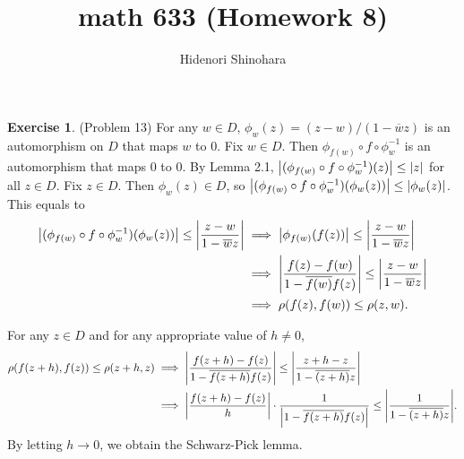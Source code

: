 \documentclass[12pt, psamsfonts]{amsart}
\theoremstyle{definition}
\newtheorem*{exer}{Exercise}
\theoremstyle{remark}
\numberwithin{equation}{section}
\begin{document}
\title{math 633 (Homework 8)}
\author{Hidenori Shinohara}
\maketitle

\begin{exer}{(Problem 13)}
  For any $w \in D$, $\phi_w(z) = (z - w) / (1 - \overline{w}z)$ is an automorphism on $D$ that maps $w$ to $0$.
  Fix $w \in D$.
  Then $\phi_{f(w)} \circ f \circ \phi_w^{-1}$ is an automorphism that maps 0 to 0.
  By Lemma 2.1, $\abs{(\phi_{f(w)} \circ f \circ \phi_w^{-1})(z)} \leq \abs{z}$ for all $z \in D$.
  Fix $z \in D$.
  Then $\phi_w(z) \in D$, so $\abs{(\phi_{f(w)} \circ f \circ \phi_w^{-1})(\phi_w(z))} \leq \abs{\phi_w(z)}$.
  This equals to
  \begin{align*}
    \abs{(\phi_{f(w)} \circ f \circ \phi_w^{-1})(\phi_w(z))} \leq \abs{\frac{z - w}{1 - \overline{w}z}}
      &\implies \abs{\phi_{f(w)}(f(z))} \leq \abs{\frac{z - w}{1 - \overline{w}z}} \\
      &\implies \abs{\frac{f(z) - f(w)}{1 - \overline{f(w)}f(z)}} \leq \abs{\frac{z - w}{1 - \overline{w}z}} \\
      &\implies \rho(f(z), f(w)) \leq \rho(z, w).
  \end{align*}

  For any $z \in D$ and for any appropriate value of $h \ne 0$,
  \begin{align*}
    \rho(f(z + h), f(z)) \leq \rho(z + h, z)
      &\implies \abs{\frac{f(z + h) - f(z)}{1 - \overline{f(z + h)}f(z)}} \leq \abs{\frac{z + h - z}{1 - \overline{(z + h)}z}} \\
      &\implies \abs{\frac{f(z + h) - f(z)}{h}} \cdot \frac{1}{\abs{1 - \overline{f(z + h)}f(z)}} \leq \abs{\frac{1}{1 - \overline{(z + h)}z}}.
  \end{align*}
  By letting $h \rightarrow 0$, we obtain the Schwarz-Pick lemma.
\end{exer}
\end{document}
